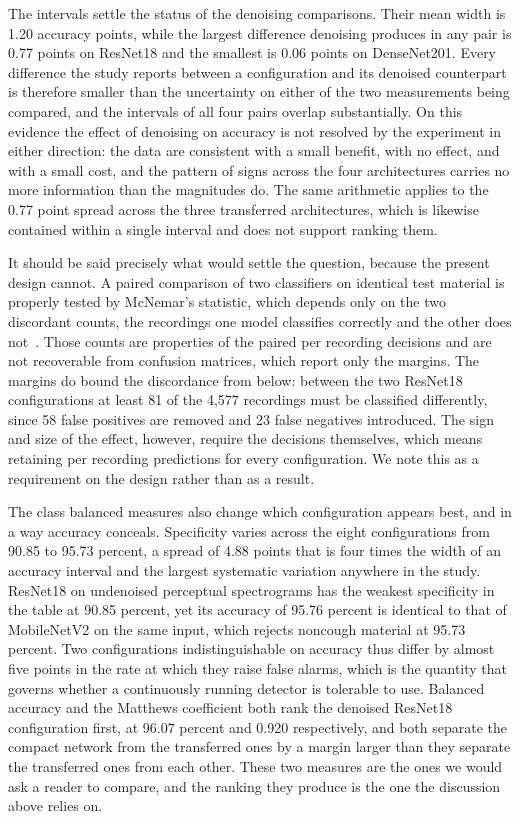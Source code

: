 The intervals settle the status of the denoising comparisons. Their mean width
is 1.20 accuracy points, while the largest difference denoising produces in
any pair is 0.77 points on ResNet18 and the smallest is 0.06 points on
DenseNet201. Every difference the study reports between a configuration and
its denoised counterpart is therefore smaller than the uncertainty on either
of the two measurements being compared, and the intervals of all four pairs
overlap substantially. On this evidence the effect of denoising on accuracy is
not resolved by the experiment in either direction: the data are consistent
with a small benefit, with no effect, and with a small cost, and the pattern
of signs across the four architectures carries no more information than the
magnitudes do. The same arithmetic applies to the 0.77 point spread across the
three transferred architectures, which is likewise contained within a single
interval and does not support ranking them.

It should be said precisely what would settle the question, because the
present design cannot. A paired comparison of two classifiers on identical
test material is properly tested by McNemar's statistic, which depends only on
the two discordant counts, the recordings one model classifies correctly and
the other does not~\cite{dietterich1998}. Those counts are properties of the
paired per recording decisions and are not recoverable from confusion
matrices, which report only the margins. The margins do bound the discordance
from below: between the two ResNet18 configurations at least 81 of the 4,577
recordings must be classified differently, since 58 false positives are
removed and 23 false negatives introduced. The sign and size of the effect,
however, require the decisions themselves, which means retaining per recording
predictions for every configuration. We note this as a requirement on the
design rather than as a result.

The class balanced measures also change which configuration appears best, and
in a way accuracy conceals. Specificity varies across the eight configurations
from 90.85 to 95.73 percent, a spread of 4.88 points that is four times the
width of an accuracy interval and the largest systematic variation anywhere in
the study. ResNet18 on undenoised perceptual spectrograms has the weakest
specificity in the table at 90.85 percent, yet its accuracy of 95.76 percent
is identical to that of MobileNetV2 on the same input, which rejects noncough
material at 95.73 percent. Two configurations indistinguishable on accuracy
thus differ by almost five points in the rate at which they raise false
alarms, which is the quantity that governs whether a continuously running
detector is tolerable to use. Balanced accuracy and the Matthews coefficient
both rank the denoised ResNet18 configuration first, at 96.07 percent and
0.920 respectively, and both separate the compact network from the transferred
ones by a margin larger than they separate the transferred ones from each
other. These two measures are the ones we would ask a reader to compare, and
the ranking they produce is the one the discussion above relies on.

